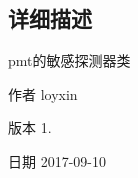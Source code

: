 \subsection{详细描述}
pmt的敏感探测器类 

\begin{DoxyAuthor}{作者}
loyxin 
\end{DoxyAuthor}
\begin{DoxyVersion}{版本}
1. 
\end{DoxyVersion}
\begin{DoxyDate}{日期}
2017-\/09-\/10 
\end{DoxyDate}
